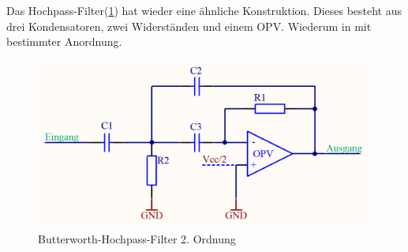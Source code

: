 Das Hochpass-Filter(\ref{fig:3.3.2.3}) hat wieder eine ähnliche Konstruktion. Dieses besteht aus drei Kondensatoren, zwei Widerständen und einem OPV. Wiederum in mit bestimmter Anordnung.
\begin{figure} [H]
	\centering	
	\includegraphics[width=1\textwidth]{img/Print4/HPFilter-Butterworth2Ordnung.PNG}
	\caption{Butterworth-Hochpass-Filter 2. Ordnung}
	\label {fig:3.3.2.3}
\end{figure}


